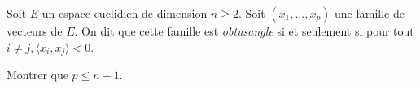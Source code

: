 \begin{defi}
    Soit $E$ un espace euclidien de dimension $n \geqslant 2$. Soit $(x_1, \dots, x_p)$ une famille de vecteurs de $E$. On dit que cette famille est \emph{obtusangle} si et seulement si pour tout $i \not= j, \langle x_i, x_j \rangle < 0$. 
\end{defi}

Montrer que $p \leqslant n + 1$. 
